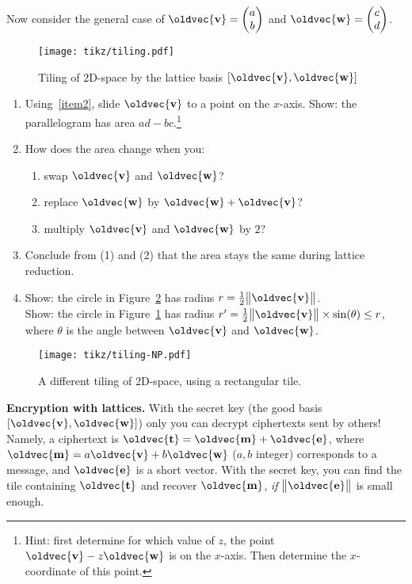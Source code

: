 \documentclass[10pt,a4paper]{article}
\newcommand{\twovec}[2]{\ensuremath{\begin{pmatrix}{#1}\\{#2}\end{pmatrix}}}
\renewcommand{\vec}[1]{\oldvec{\mathbf{#1}}}
\DeclarePairedDelimiter{\norm}{\big\lVert}{\big\rVert}
\begin{document}
\noindent
Now consider the general case of \(\vec{v} = \twovec{a}{b}\) and \(\vec{w} = \twovec{c}{d}\).
\begin{figure}[h!]
	\centering\texttt{[image: tikz/tiling.pdf]}
	\caption{Tiling of 2D-space by the lattice basis \([\vec{v}, \vec{w}]\)}\label{fig:tiling}
\end{figure}

\begin{enumerate}[resume*]
	\item Using~\ref{item2}, slide \(\vec{v}\) to a point on the \(x\)-axis.
		Show: the parallelogram has area \(ad - bc\).\footnote{Hint: first determine for which value of \(z\), the point \(\vec{v} - z \vec{w}\) is on the \(x\)-axis. Then determine the \(x\)-coordinate of this point.}

	\item How does the area change when you:
		\begin{enumerate}
		\item swap \(\vec{v}\) and \(\vec{w}\)?
		\item replace \(\vec{w}\) by \(\vec{w} + \vec{v}\)?
		\item multiply \(\vec{v}\) and \(\vec{w}\) by \(2\)?
		\end{enumerate}
	\item Conclude from (1) and (2) that the area stays the same during lattice reduction.

	\item
		Show: the circle in Figure~\ref{fig:tiling-np} has radius \(r = \frac12 \norm{\vec{v}}\). \\
		Show: the circle in Figure~\ref{fig:tiling} has radius \(r' = \frac12 \norm{\vec{v}} \times \sin(\theta) \leq r\), where \(\theta\) is the angle between \(\vec{v}\) and \(\vec{w}\). \\
\end{enumerate}
\begin{figure}[h!]
	\centering\texttt{[image: tikz/tiling-NP.pdf]}
	\caption{A different tiling of 2D-space, using a rectangular tile.}\label{fig:tiling-np}
\end{figure}
\noindent
\textbf{Encryption with lattices.}
With the secret key (the good basis \([\vec{v},\vec{w}]\)) only you can decrypt ciphertexts sent by others!
Namely, a ciphertext is \(\vec{t} = \vec{m} + \vec{e}\),
	where \(\vec{m} = a \vec{v} + b \vec{w}\) (\(a, b\) integer) corresponds to a message,
	and \(\vec{e}\) is a short vector.
With the secret key, you can find the tile containing \(\vec{t}\) and recover \(\vec{m}\), \emph{if} \(\norm{\vec{e}}\) is small enough.
\end{document}
